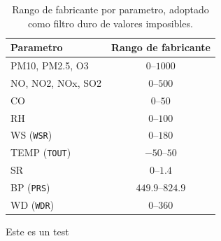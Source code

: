 \begin{table}[t]
  \centering
  \caption{Rango de fabricante por parametro, adoptado como filtro duro de
    valores imposibles.}
  \label{tab:dic-fabricante}
  \small
  \begin{tabular}{lc}
    \toprule
    Parametro & Rango de fabricante \\
    \midrule
    PM10, PM2.5, O3      & $0$--$1000$     \\
    NO, NO2, NOx, SO2    & $0$--$500$      \\
    CO                   & $0$--$50$       \\
    RH                   & $0$--$100$      \\
    WS (\texttt{WSR})    & $0$--$180$      \\
    TEMP (\texttt{TOUT}) & $-50$--$50$     \\
    SR                   & $0$--$1.4$      \\
    BP (\texttt{PRS})    & $449.9$--$824.9$\\
    WD (\texttt{WDR})    & $0$--$360$      \\
    \bottomrule
  \end{tabular}
\end{table}


Este es un test